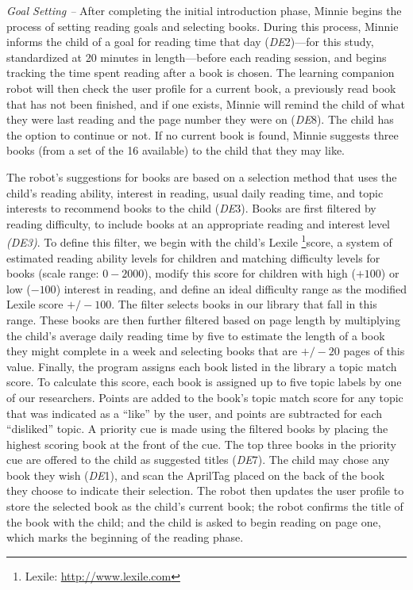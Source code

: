 \documentclass{sigchi}
\begin{document}
\textit{Goal Setting --} After completing the initial introduction phase, Minnie begins the process of setting reading goals and selecting books. During this process, Minnie informs the child of a goal for reading time that day (\textit{DE}2)---for this study, standardized at 20 minutes in length---before each reading session, and begins tracking the time spent reading after a book is chosen. The learning companion robot will then check the user profile for a current book, a previously read book that has not been finished, and if one exists, Minnie will remind the child of what they were last reading and the page number they were on (\textit{DE}8). The child has the option to continue or not. If no current book is found, Minnie suggests three books (from a set of the 16 available) to the child that they may like.

The robot's suggestions for books are based on a selection method that uses the child's reading ability, interest in reading, usual daily reading time, and topic interests to recommend books to the child (\textit{DE}3). Books are first filtered by reading difficulty, to include books at an appropriate reading and interest level \textit{(DE3)}. To define this filter, we begin with the child's Lexile \footnote{Lexile: \href{http://www.lexile.com}{http://www.lexile.com}}score, a system of estimated reading ability levels for children and matching difficulty levels for books (scale range: $0-2000$), modify this score for children with high ($+100$) or low ($-100$) interest in reading, and define an ideal difficulty range as the modified Lexile score $+/-100$. The filter selects books in our library that fall in this range. These books are then further filtered based on page length by multiplying the child's average daily reading time by five to estimate the length of a book they might complete in a week and selecting books that are $+/-20$ pages of this value. Finally, the program assigns each book listed in the library a topic match score. To calculate this score, each book is assigned up to five topic labels by one of our researchers. Points are added to the book's topic match score for any topic that was indicated as a ``like'' by the user, and points are subtracted for each ``disliked'' topic. A priority cue is made using the filtered books by placing the highest scoring book at the front of the cue. The top three books in the priority cue are offered to the child as suggested titles (\textit{DE}7). The child may chose any book they wish (\textit{DE}1), and scan the AprilTag placed on the back of the book they choose to indicate their selection. The robot then updates the user profile to store the selected book as the child's current book; the robot confirms the title of the book with the child; and the child is asked to begin reading on page one, which marks the beginning of the reading phase.
\end{document}
